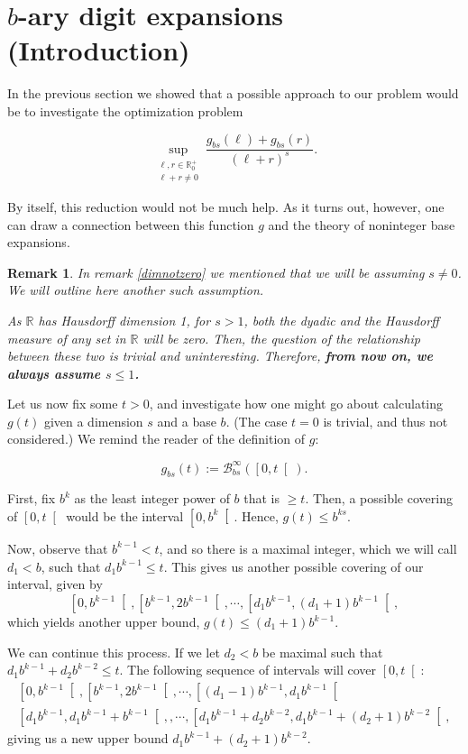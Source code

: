 \documentclass[11pt, reqno]{amsart}
\newcommand{\R}{\mathbb{R}}
\newcommand{\BB}{\mathcal{B}}
\newtheorem{remark}{Remark}
\begin{document}
\section{$b$-ary digit expansions (Introduction)}\label{sec6}

In the previous section we showed that a possible approach to our problem would be to investigate the optimization problem

\[ \sup_{\substack{\ell,r \in \R^+_0\\\ell+r \neq 0}} \frac{g_{bs}(\ell) + g_{bs}(r)}{(\ell + r)^s}. \]

By itself, this reduction would not be much help. As it turns out, however, one can draw a connection between this function $g$ and the theory of noninteger base expansions.

\begin{remark}
In remark \ref{dimnotzero} we mentioned that we will be assuming $s \neq 0$. We will outline here another such assumption.

As $\R$ has Hausdorff dimension 1, for $s > 1$, both the dyadic and the Hausdorff measure of \emph{any} set in $\R$ will be zero. Then, the question of the relationship between these two is trivial and uninteresting. Therefore, \textbf{from now on, we always assume $s \leq 1$.}
\end{remark}

Let us now fix some $t > 0$, and investigate how one might go about calculating $g(t)$ given a dimension $s$ and a base $b$. (The case $t = 0$ is trivial, and thus not considered.) We remind the reader of the definition of $g$:

\[g_{bs}(t) := \BB_{bs}^\infty(\left[0, t \right[).\]

First, fix $b^k$ as the least integer power of $b$ that is $\geq t$. Then, a possible covering of $\left[0, t \right[$ would be the interval $\left[0, b^k\right[$. Hence, $g(t) \leq b^{ks}$.

Now, observe that $b^{k-1} < t$, and so there is a maximal integer, which we will call $d_1 < b$, such that $d_1 b^{k-1} \leq t$. This gives us another possible covering of our interval, given by
\[\left[0, b^{k-1} \right[, \left[b^{k-1}, 2 b^{k-1} \right[, \cdots, \left[d_1 b^{k-1}, (d_1 + 1) b^{k-1} \right[,\]
which yields another upper bound, $g(t) \leq (d_1 + 1) b^{k-1}$.

We can continue this process. If we let $d_2 < b$ be maximal such that $d_1 b^{k-1} + d_2 b^{k-2} \leq t$. The following sequence of intervals will cover $\left[0, t \right[$:
\begin{multline*}
\left[0, b^{k-1} \right[, \left[b^{k-1}, 2 b^{k-1} \right[, \cdots, \left[(d_1 - 1) b^{k-1}, d_1 b^{k-1} \right[ \\
\left[d_1 b^{k-1}, d_1 b^{k-1} + b^{k-1} \right[, , \cdots, \left[d_1 b^{k-1} + d_2 b^{k-2}, d_1 b^{k-1} + (d_2 + 1) b^{k-2} \right[,
\end{multline*}
giving us a new upper bound $d_1 b^{k-1} + (d_2 + 1) b^{k-2}$.
\end{document}
